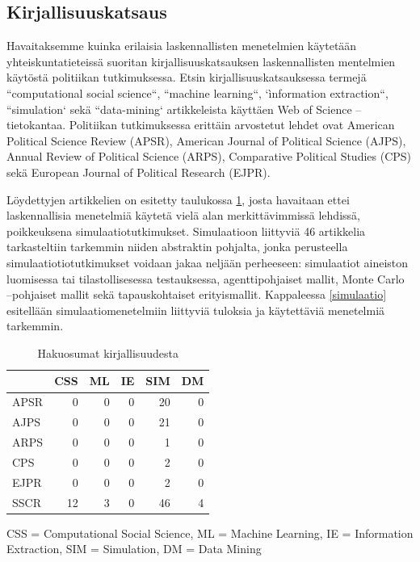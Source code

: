 \documentclass[finnish,gradu,twoside,12pt]{tktltiki}
\begin{document}
\subsection{Kirjallisuuskatsaus}

Havaitaksemme kuinka erilaisia laskennallisten menetelmien käytetään yhteiskuntatieteissä suoritan kirjallisuuskatsauksen laskennallisten mentelmien käytöstä politiikan tutkimuksessa. Etsin kirjallisuuskatsauksessa termejä ``computational social science``, ``machine learning``, `ìnformation extraction``, ``simulation` sekä ``data-mining` artikkeleista käyttäen Web of Science --tietokantaa. Politiikan tutkimuksessa erittäin arvostetut lehdet ovat American Political Science Review (APSR), American Journal of Political Science  (AJPS), Annual Review of Political Science (ARPS), Comparative Political Studies (CPS) sekä European Journal of Political Research (EJPR). %


Löydettyjen artikkelien on esitetty taulukossa \ref{kirjallisuuskataus}, josta havaitaan ettei laskennallisia menetelmiä käytetä vielä alan merkittävimmissä lehdissä, poikkeuksena simulaatiotutkimukset. Simulaatioon liittyviä 46 artikkelia tarkasteltiin tarkemmin niiden abstraktin pohjalta, jonka perusteella simulaatiotiotutkimukset voidaan jakaa neljään perheeseen: simulaatiot aineiston luomisessa tai tilastollisesessa testauksessa, agenttipohjaiset mallit, Monte Carlo --pohjaiset mallit sekä tapauskohtaiset erityismallit. Kappaleessa \ref{simulaatio} esitellään simulaatiomenetelmiin liittyviä tuloksia ja käytettäviä menetelmiä tarkemmin.

\begin{table}

\begin{tabular}{lrrrrr}
~  & CSS & ML & IE  & SIM & DM \\
\hline
APSR  & 0 & 0 & 0 & 20 & 0 \\
AJPS  & 0 & 0 & 0 & 21 & 0 \\
ARPS  & 0 & 0 & 0 &  1 & 0 \\ 
CPS   & 0 & 0 & 0 &  2 & 0 \\
EJPR  & 0 & 0 & 0 &  2 & 0 \\
\hline
SSCR & 12 & 3 & 0 & 46 & 4  \\
\hline
\end{tabular}
\caption{Hakuosumat kirjallisuudesta}
CSS = Computational Social Science, ML = Machine Learning, IE = Information Extraction, SIM = Simulation, DM = Data Mining
\label{kirjallisuuskataus}

\end{table}
\end{document}
